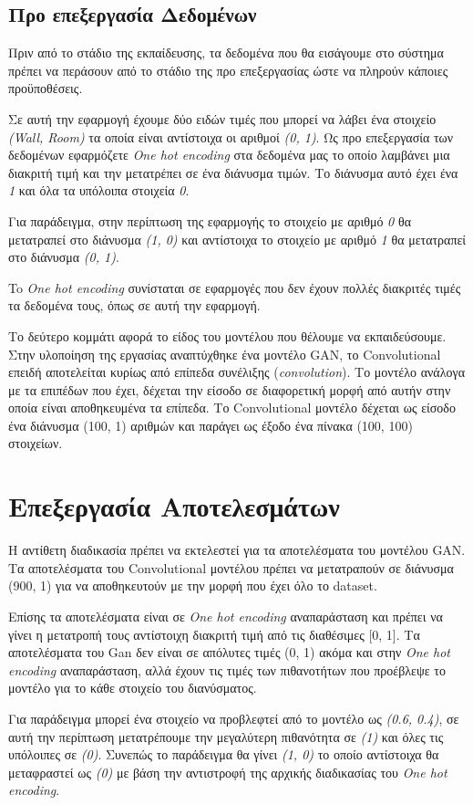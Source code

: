 \subsection{Προ επεξεργασία Δεδομένων}
Πριν από το στάδιο της εκπαίδευσης, τα δεδομένα που θα εισάγουμε στο σύστημα πρέπει να περάσουν από το στάδιο της προ επεξεργασίας ώστε να πληρούν κάποιες προϋποθέσεις.
\par
Σε αυτή την εφαρμογή έχουμε δύο ειδών τιμές που μπορεί να λάβει ένα στοιχείο \textit{(Wall, Room)} τα οποία είναι αντίστοιχα οι αριθμοί \textit{(0, 1)}. Ως προ επεξεργασία των δεδομένων εφαρμόζετε \textit{One hot encoding} στα δεδομένα μας το οποίο λαμβάνει μια διακριτή τιμή και την μετατρέπει σε ένα διάνυσμα τιμών. Το διάνυσμα αυτό έχει ένα \textit{1} και όλα τα υπόλοιπα στοιχεία \textit{0}.
\par
Για παράδειγμα, στην περίπτωση της εφαρμογής το στοιχείο με αριθμό \textit{0} θα μετατραπεί στο διάνυσμα \textit{(1, 0)} και αντίστοιχα το στοιχείο  με αριθμό \textit{1} θα μετατραπεί στο διάνυσμα \textit{(0, 1)}. 
\par
To \textit{One hot encoding} συνίσταται σε εφαρμογές που δεν έχουν πολλές διακριτές τιμές τα δεδομένα τους, όπως σε αυτή την εφαρμογή.

\par
Το δεύτερο κομμάτι αφορά το είδος του μοντέλου που θέλουμε να εκπαιδεύσουμε. Στην υλοποίηση της εργασίας αναπτύχθηκε ένα μοντέλο GAN, το Convolutional επειδή αποτελείται κυρίως από επίπεδα συνέλιξης (\textit{convolution}). Το μοντέλο ανάλογα με τα επιπέδων που έχει, δέχεται την είσοδο σε διαφορετική μορφή από αυτήν στην οποία είναι αποθηκευμένα τα επίπεδα. Το Convolutional μοντέλο δέχεται ως είσοδο ένα διάνυσμα (100, 1) αριθμών και παράγει ως έξοδο ένα πίνακα (100, 100) στοιχείων.
\par


\section{Επεξεργασία Αποτελεσμάτων}
Η αντίθετη διαδικασία πρέπει να εκτελεστεί για τα αποτελέσματα του μοντέλου GAN. Τα αποτελέσματα του Convolutional μοντέλου πρέπει να μετατραπούν σε διάνυσμα (900, 1) για να αποθηκευτούν με την μορφή που έχει όλο το dataset.
\par
Επίσης τα αποτελέσματα είναι σε \textit{One hot encoding} αναπαράσταση και πρέπει να γίνει η μετατροπή τους αντίστοιχη διακριτή τιμή από τις διαθέσιμες [0, 1]. Τα αποτελέσματα του Gan δεν είναι σε απόλυτες τιμές (0, 1) ακόμα και στην \textit{One hot encoding} αναπαράσταση, αλλά έχουν τις τιμές των πιθανοτήτων που προέβλεψε το μοντέλο για το κάθε στοιχείο του διανύσματος. 
\par
Για παράδειγμα μπορεί ένα στοιχείο να προβλεφτεί από το μοντέλο ως \textit{(0.6, 0.4)}, σε αυτή την περίπτωση μετατρέπουμε την μεγαλύτερη πιθανότητα σε \textit{(1)} και όλες τις υπόλοιπες σε \textit{(0)}. Συνεπώς το παράδειγμα θα γίνει \textit{(1, 0)} το οποίο αντίστοιχα θα μεταφραστεί ως \textit{(0)} με βάση την αντιστροφή της αρχικής διαδικασίας του \textit{One hot encoding}.


